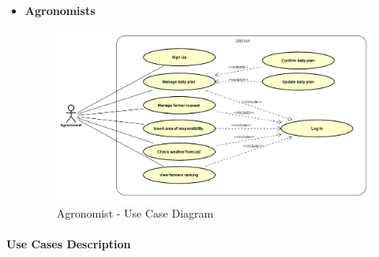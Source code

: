 \documentclass[table, 12pt]{article}
\begin{document}
\begin{itemize}
\begin{center}
\begin{figure}[H]
            \label{fig: UseCase_Farmer}
        \end{figure}
    \end{center}
    \newpage
    \item \textbf {Agronomists}
    \begin{center}
        \begin{figure}[H]
            \includegraphics[scale=0.60, center]{assets/Use cases/UseCase_Agronomist.png}
            \caption{Agronomist - Use Case Diagram}
            \label{fig: UseCase_Agronomist}
        \end{figure}
    \end{center}
    \newpage
\end{itemize}

    \paragraph{Use Cases Description}
    
\end{document}
